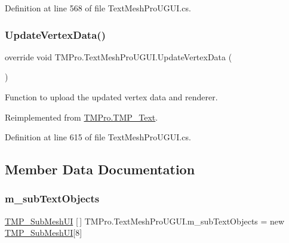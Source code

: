 Definition at line 568 of file Text\+Mesh\+Pro\+U\+G\+U\+I.\+cs.

\mbox{\label{class_t_m_pro_1_1_text_mesh_pro_u_g_u_i_a3f32882137aab111603158a4452bc53b}} 
\subsubsection{\texorpdfstring{UpdateVertexData()}{UpdateVertexData()}\hspace{0.1cm}{\footnotesize\ttfamily [2/2]}}
{\footnotesize\ttfamily override void T\+M\+Pro.\+Text\+Mesh\+Pro\+U\+G\+U\+I.\+Update\+Vertex\+Data (\begin{DoxyParamCaption}{ }\end{DoxyParamCaption})\hspace{0.3cm}{\ttfamily [virtual]}}



Function to upload the updated vertex data and renderer. 



Reimplemented from \mbox{\hyperlink{class_t_m_pro_1_1_t_m_p___text_a63f0f98478ef7b8c9a314f74c9836e39}{T\+M\+Pro.\+T\+M\+P\+\_\+\+Text}}.



Definition at line 615 of file Text\+Mesh\+Pro\+U\+G\+U\+I.\+cs.



\subsection{Member Data Documentation}
\mbox{\label{class_t_m_pro_1_1_text_mesh_pro_u_g_u_i_a9dbdd3c243c1c77725a9d97ef99ee457}} 
\subsubsection{\texorpdfstring{m\_subTextObjects}{m\_subTextObjects}}
{\footnotesize\ttfamily \mbox{\hyperlink{class_t_m_pro_1_1_t_m_p___sub_mesh_u_i}{T\+M\+P\+\_\+\+Sub\+Mesh\+UI}} \mbox{[}$\,$\mbox{]} T\+M\+Pro.\+Text\+Mesh\+Pro\+U\+G\+U\+I.\+m\+\_\+sub\+Text\+Objects = new \mbox{\hyperlink{class_t_m_pro_1_1_t_m_p___sub_mesh_u_i}{T\+M\+P\+\_\+\+Sub\+Mesh\+UI}}\mbox{[}8\mbox{]}\hspace{0.3cm}{\ttfamily [protected]}}



